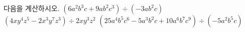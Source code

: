 다음을 계산하시오.
 $(6a^2b^3c+9ab^2c^3)\div(-3ab^2c)$
 $(4xy^4z^5-2x^3y^7z^3)\div 2xy^3z^2$
 $(25a^4b^5c^6-5a^3b^2c+10a^6b^7c^9)\div(-5a^2b^5c)$
